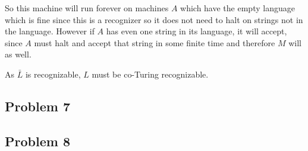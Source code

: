 \documentclass[english]{article}
\begin{document}
So this machine will run forever on machines $A$ which have the empty language
which is fine since this is a recognizer so it does not need to halt on 
strings not in the language. However if $A$ has even one string in its
language, it will accept, since $A$ must halt and accept that string in some
finite time and therefore $M$ will as well.

As $\bar{L}$ is recognizable, $L$ must be co-Turing recognizable. 

\subsection*{Problem 7}

\subsection*{Problem 8}
\end{document}
